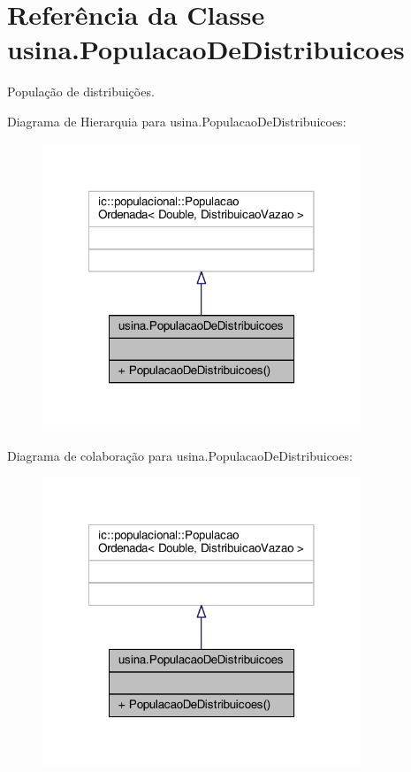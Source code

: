 \hypertarget{classusina_1_1_populacao_de_distribuicoes}{\section{Referência da Classe usina.\-Populacao\-De\-Distribuicoes}
\label{classusina_1_1_populacao_de_distribuicoes}
}


População de distribuições.  




Diagrama de Hierarquia para usina.\-Populacao\-De\-Distribuicoes\-:\nopagebreak
\begin{figure}[H]
\begin{center}
\leavevmode
\includegraphics[width=270pt]{classusina_1_1_populacao_de_distribuicoes__inherit__graph}
\end{center}
\end{figure}


Diagrama de colaboração para usina.\-Populacao\-De\-Distribuicoes\-:\nopagebreak
\begin{figure}[H]
\begin{center}
\leavevmode
\includegraphics[width=270pt]{classusina_1_1_populacao_de_distribuicoes__coll__graph}
\end{center}
\end{figure}
